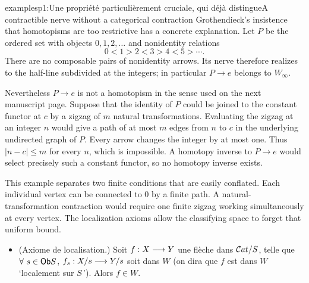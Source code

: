 \begin{dcomment}{examples}{p1:Une propriété particulièrement cruciale, qui déjà distingue}{A contractible nerve without a categorical contraction}
Grothendieck's insistence that homotopisms are too restrictive has a concrete explanation. Let \(P\) be the ordered set with objects \(0,1,2,\ldots\) and nonidentity relations
\[
  0<1>2<3>4<5>\cdots .
\]
There are no composable pairs of nonidentity arrows. Its nerve therefore realizes to the half-line subdivided at the integers; in particular \(P\to e\) belongs to \(W_\infty\).

Nevertheless \(P\to e\) is not a homotopism in the sense used on the next manuscript page. Suppose that the identity of \(P\) could be joined to the constant functor at \(c\) by a zigzag of \(m\) natural transformations. Evaluating the zigzag at an integer \(n\) would give a path of at most \(m\) edges from \(n\) to \(c\) in the underlying undirected graph of \(P\). Every arrow changes the integer by at most one. Thus \(|n-c|\leq m\) for every \(n\), which is impossible. A homotopy inverse to \(P\to e\) would select precisely such a constant functor, so no homotopy inverse exists.

This example separates two finite conditions that are easily conflated. Each individual vertex can be connected to \(0\) by a finite path. A natural-transformation contraction would require one finite zigzag working simultaneously at every vertex. The localization axioms allow the classifying space to forget that uniform bound.
\end{dcomment}


\begin{itemize}[leftmargin=*]
\item[\textbf{W(2)}] (Axiome de localisation.) Soit $f : X \longrightarrow Y$ une flèche dans $\mathcal{C}at/S$, telle que $\forall\ s \in \mathsf{Ob} S$, $f_s : X/s \longrightarrow Y/s$ soit dans $W$ (on dira que $f$ est dans $W$ `localement sur $S$\,'). Alors $f \in W$.
\end{itemize}


